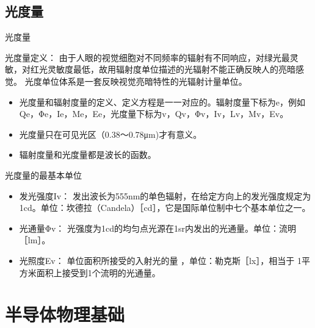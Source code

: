 \documentclass[trans]{beamer} %
\begin{document}
\subsection{光度量}
\begin{frame}{光度量}
	
	\begin{alertblock}{光度量定义：}
	由于人眼的视觉细胞对不同频率的辐射有不同响应，对绿光最灵敏，对红光灵敏度最低，故用辐射度单位描述的光辐射不能正确反映人的亮暗感觉。 
光度单位体系是一套反映视觉亮暗特性的光辐射计量单位。
	\end{alertblock}
	
	\begin{itemize}
    
        \item 光度量和辐射度量的定义、定义方程是一一对应的。辐射度量下标为e，例如Qe，Φe，Ie，Me，Ee，光度量下标为v，Qv，Φv，Iv，Lv，Mv，Ev。


        \item 光度量只在可见光区（0.38～0.78μm)才有意义。
        \item 辐射度量和光度量都是波长的函数。 
    \end{itemize}
	
\end{frame}
\begin{frame}{光度量的最基本单位}
    \begin{itemize}
        \item \alert{发光强度Iv：}
发出波长为555nm的单色辐射，在给定方向上的发光强度规定为1cd。单位：坎德拉（Candela）［cd］，它是国际单位制中七个基本单位之一。
        \item \alert{光通量Φv：}
光强度为1cd的均匀点光源在1sr内发出的光通量。单位：流明［lm］。
        \item \alert{光照度Ev：}
单位面积所接受的入射光的量 ，单位：勒克斯［lx］，相当于 1平方米面积上接受到1个流明的光通量。 

    \end{itemize}
    
\end{frame}

\section{半导体物理基础}
\end{document}
